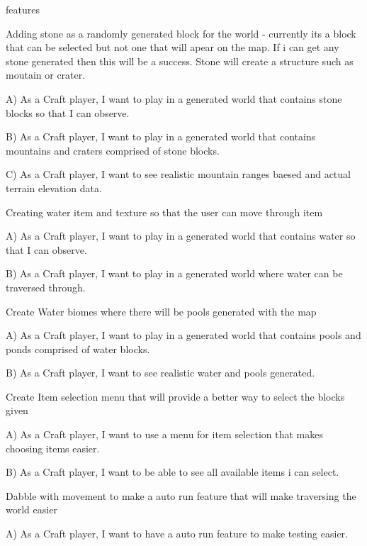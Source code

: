 features


\begin{DoxyEnumerate}
\item Adding stone as a randomly generated block for the world -\/ currently its a block that can be selected but not one that will apear on the map. If i can get any stone generated then this will be a success. Stone will create a structure such as moutain or crater. \begin{DoxyVerb}  A) As a Craft player, I want to play in a generated world that contains stone blocks so that I can observe. 

  B) As a Craft player, I want to play in a generated world that contains mountains and craters comprised of stone blocks.

  C) As a Craft player, I want to see realistic mountain ranges baesed and actual terrain elevation data.
\end{DoxyVerb}

\item Creating water item and texture so that the user can move through item \begin{DoxyVerb}  A) As a Craft player, I want to play in a generated world that contains water so that I can observe. 

  B) As a Craft player, I want to play in a generated world where water can be traversed through.
\end{DoxyVerb}

\item Create Water biomes where there will be pools generated with the map \begin{DoxyVerb}  A) As a Craft player, I want to play in a generated world that contains pools and ponds comprised of water blocks.

  B) As a Craft player, I want to see realistic water and pools generated.
\end{DoxyVerb}

\item Create Item selection menu that will provide a better way to select the blocks given \begin{DoxyVerb}  A) As a Craft player, I want to use a menu for item selection that makes choosing items easier.

  B) As a Craft player, I want to be able to see all available items i can select.
\end{DoxyVerb}

\item Dabble with movement to make a auto run feature that will make traversing the world easier \begin{DoxyVerb}  A) As a Craft player, I want to have a auto run feature to make testing easier.
\end{DoxyVerb}
 
\end{DoxyEnumerate}